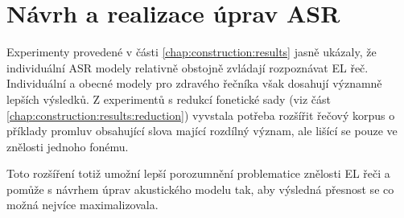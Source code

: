 \chapter{Návrh a realizace úprav ASR}
\label{chap:realisation}

Experimenty provedené v části \ref{chap:construction:results} jasně ukázaly, že individuální ASR modely relativně obstojně zvládají rozpoznávat EL řeč. Individuální a obecné modely pro zdravého řečníka však dosahují významně lepších výsledků. Z experimentů s redukcí fonetické sady (viz část \ref{chap:construction:results:reduction}) vyvstala potřeba rozšířit řečový korpus o příklady promluv obsahující slova mající rozdílný význam, ale lišící se pouze ve znělosti jednoho fonému.

Toto rozšíření totiž umožní lepší porozumnění problematice znělosti EL řeči a pomůže s návrhem úprav akustického modelu tak, aby výsledná přesnost se co možná nejvíce maximalizovala.










